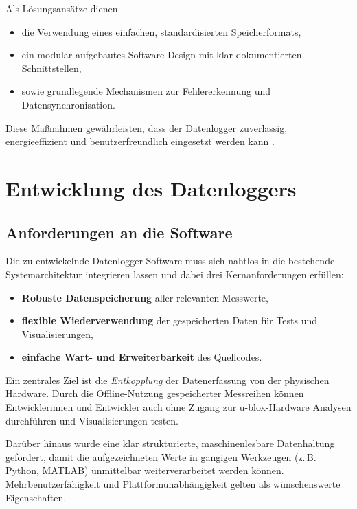 \documentclass[a4paper, 12pt]{article} %
\begin{document}
Als Lösungsansätze dienen

\begin{itemize}[leftmargin=2em]
  \item die Verwendung eines einfachen, standardisierten Speicherformats,
  \item ein modular aufgebautes Software-Design mit klar dokumentierten Schnittstellen,
  \item sowie grundlegende Mechanismen zur Fehlererkennung und Datensynchronisation.
\end{itemize}

Diese Maßnahmen gewährleisten, dass der Datenlogger zuverlässig, energieeffizient und benutzerfreundlich eingesetzt werden kann \cite{poole2020data}.

\clearpage


\section{Entwicklung des Datenloggers}

\subsection{Anforderungen an die Software}
Die zu entwickelnde Datenlogger-Software muss sich nahtlos in die bestehende Systemarchitektur integrieren lassen und dabei drei Kernanforderungen 
erfüllen:

\begin{itemize}[leftmargin=2em]
  \item \textbf{Robuste Datenspeicherung} aller relevanten Messwerte,
  \item \textbf{flexible Wiederverwendung} der gespeicherten Daten für Tests und Visualisierungen,
  \item \textbf{einfache Wart- und Erweiterbarkeit} des Quellcodes.
\end{itemize}

Ein zentrales Ziel ist die \emph{Entkopplung} der Datenerfassung von der physischen Hardware.  
Durch die Offline-Nutzung gespeicherter Messreihen können Entwicklerinnen und Entwickler auch ohne Zugang zur u-blox-Hardware Analysen durchführen 
und Visualisierungen testen.  

Darüber hinaus wurde eine klar strukturierte, maschinenlesbare Datenhaltung gefordert, damit die aufgezeichneten Werte in gängigen Werkzeugen 
(z.\,B. Python, MATLAB) unmittelbar weiterverarbeitet werden können.  
Mehrbenutzerfähigkeit und Plattformunabhängigkeit gelten als wünschenswerte Eigenschaften.
\end{document}
